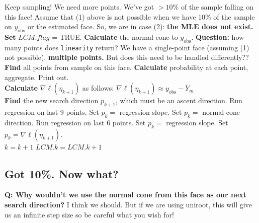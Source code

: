 \documentclass{amsbook}
\newcommand{\yobs}{y_{\textrm{obs}}}
\theoremstyle{definition}
\theoremstyle{remark}
\begin{document}
\begin{algorithmic}
		\State	Keep sampling!	We need more points.
	\Else
		\State We've got $> 10\%$ of the sample falling on this face!
		\State Assume that (1) above is not possible when we have 10\% of the 
		\State sample on $\yobs$ or the estimated face.  So, we are in case (2): 
		\State \textbf{the MLE does not exist.}\\

		\State \textbf{Set} $LCM.flag$ = TRUE.
		\State \textbf{Calculate} the normal cone to $\yobs$.
		\State \textbf{Question:} how many points does \texttt{linearity} return?
			\State We have a single-point face (assuming (1) not possible).
		\Else
			\State \textbf{multiple points.}
			\State But does this need to be handled differently??
			\State \textbf{Find} all points from sample on this face.
			\State \textbf{Calculate} probability at each point, aggregate.  Print out.
		\EndIf
	\EndIf
\EndIf\\
\State \textbf{Calculate} $\nabla \ell( \eta_{k+1})$ as follows: \label{Calc:nabla}
	\State $\nabla \ell( \eta_{k+1}) \approx \yobs - \bar{Y}_m$
\Else{
	\State $\nabla \ell( \eta_{k+1}) \approx \yobs - \bar{Y}_m^{LCM}$.
}
\EndIf\\

\State \textbf{Find} the new search direction $p_{k+1}$, which must be an ascent direction.
	\State Run regression on last 9 points.
	\State Set $p_k = $ regression slope.
		\State Set $p_k = $ normal cone direction.
		\State Run regression on last 6 points.
		\State Set $p_k = $ regression slope.
	\EndIf
\Else
	\State Set $p_k = \nabla \ell( \eta_{k+1})$.
\EndIf\\

\State $k = k + 1$
	\State $LCM.k = LCM.k + 1$
\EndIf
\EndWhile
\end{algorithmic}

\newpage
\subsection{Got 10\%.  Now what?}

\textbf{Q: Why wouldn't we use the normal cone from this face as our next search 
direction?}
I think we should.  But if we are using uniroot, this will give us an infinite step 
size so be careful what you wish for!
\end{document}

